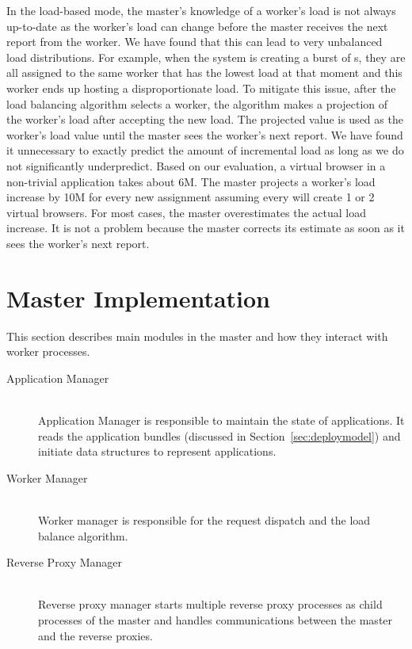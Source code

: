 In the load-based mode, the master's knowledge of a worker's load is not
always up-to-date as the worker's load can change before the master receives the
next report from the worker. We have found that this can lead to very unbalanced load
distributions. For example, when the system is creating a burst of \appins{}s,
they are all assigned to the same worker that has the lowest load at that
moment and this worker ends up hosting a disproportionate load.  To mitigate
this issue,  after the load balancing algorithm selects a worker, the
algorithm makes a projection of the worker's load after accepting the new
load. The projected value is used as the worker's load value  until the master
sees the worker's next report.  We have found it unnecessary to exactly 
predict the amount of incremental load as long as we do not significantly 
underpredict.  Based on our evaluation, a virtual
browser in a non-trivial application takes about 6M.  The master projects a
worker's load increase by 10M for every new \appins assignment assuming every
\appins will create 1 or 2 virtual browsers.  For most cases, the master
overestimates the actual load increase. It is not a problem because the master
corrects its estimate as soon as it sees the worker's next report. 

\section{Master Implementation}

This section describes main modules in the master and how they interact
with worker processes.

\begin{description}
\item[Application Manager] \hfill \\
Application Manager is responsible to maintain the state of applications. It
reads the application bundles (discussed in Section~\ref{sec:deploymodel}) and
initiate data structures to represent applications.

\item[Worker Manager] \hfill \\
Worker manager is responsible for the request dispatch
and the load balance algorithm.

\item[Reverse Proxy Manager] \hfill \\
Reverse proxy manager starts multiple reverse proxy processes as child
processes of the master and handles communications between the master and
the reverse proxies.
\end{description}

